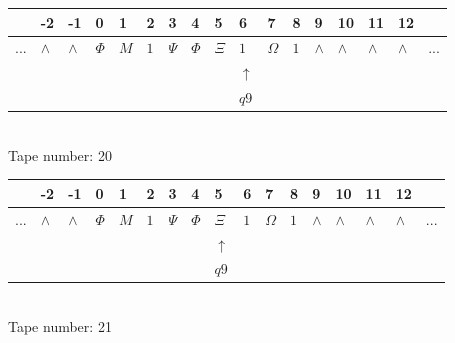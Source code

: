 \documentclass[11pt]{article}
\begin{document}
\begin{table}[H]
\centering
\begin{tabular}{lllllllllllllllll}
 & -2 & -1 & 0 & 1 & 2 & 3 & 4 & 5 & 6 & 7 & 8 & 9 & 10 & 11 & 12 & \\
\hline
$...$ & \multicolumn{1}{|l|}{$\wedge$} & \multicolumn{1}{|l|}{$\wedge$} & \multicolumn{1}{|l|}{$\Phi$} & \multicolumn{1}{|l|}{$M$} & \multicolumn{1}{|l|}{$1$} & \multicolumn{1}{|l|}{$\Psi$} & \multicolumn{1}{|l|}{$\Phi$} & \multicolumn{1}{|l|}{$\Xi$} & \multicolumn{1}{|l|}{$1$} & \multicolumn{1}{|l|}{$\Omega$} & \multicolumn{1}{|l|}{$1$} & \multicolumn{1}{|l|}{$\wedge$} & \multicolumn{1}{|l|}{$\wedge$} & \multicolumn{1}{|l|}{$\wedge$} & \multicolumn{1}{|l|}{$\wedge$} & $...$\\
\hline
&  &  &  &  &  &  &  &  & $\uparrow$ &  &  &  &  &  &  &  \\
&  &  &  &  &  &  &  &  & $ q9 $ &  &  &  &  &  &  &  \\
\end{tabular}
\\
Tape number: 20
\noindent\makebox[\linewidth]{\hdashrule{\textwidth}{1pt}{1pt}}\end{table}

\begin{table}[H]
\centering
\begin{tabular}{lllllllllllllllll}
 & -2 & -1 & 0 & 1 & 2 & 3 & 4 & 5 & 6 & 7 & 8 & 9 & 10 & 11 & 12 & \\
\hline
$...$ & \multicolumn{1}{|l|}{$\wedge$} & \multicolumn{1}{|l|}{$\wedge$} & \multicolumn{1}{|l|}{$\Phi$} & \multicolumn{1}{|l|}{$M$} & \multicolumn{1}{|l|}{$1$} & \multicolumn{1}{|l|}{$\Psi$} & \multicolumn{1}{|l|}{$\Phi$} & \multicolumn{1}{|l|}{$\Xi$} & \multicolumn{1}{|l|}{$1$} & \multicolumn{1}{|l|}{$\Omega$} & \multicolumn{1}{|l|}{$1$} & \multicolumn{1}{|l|}{$\wedge$} & \multicolumn{1}{|l|}{$\wedge$} & \multicolumn{1}{|l|}{$\wedge$} & \multicolumn{1}{|l|}{$\wedge$} & $...$\\
\hline
&  &  &  &  &  &  &  & $\uparrow$ &  &  &  &  &  &  &  &  \\
&  &  &  &  &  &  &  & $ q9 $ &  &  &  &  &  &  &  &  \\
\end{tabular}
\\
Tape number: 21
\noindent\makebox[\linewidth]{\hdashrule{\textwidth}{1pt}{1pt}}\end{table}
\end{document}
